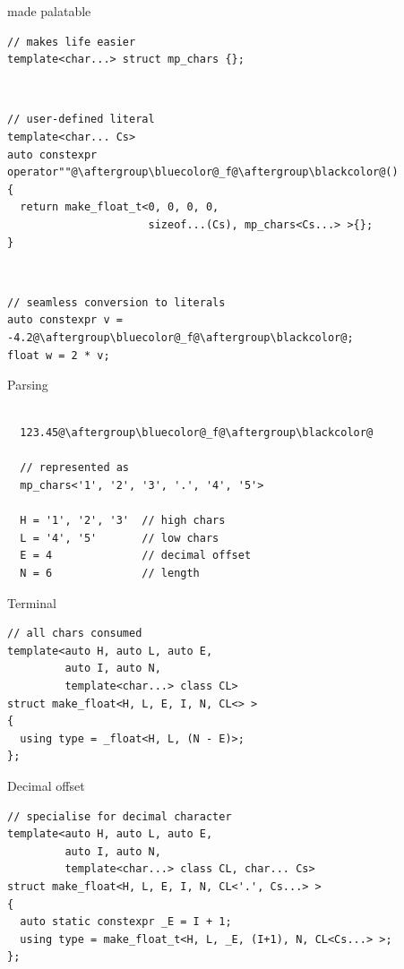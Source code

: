 \documentclass[xcolor=dvipsnames]{beamer}
\begin{document}
\begin{frame}[fragile]{made palatable}
\begin{lstlisting}
// makes life easier
template<char...> struct mp_chars {};
\end{lstlisting}

~

\begin{lstlisting}
// user-defined literal
template<char... Cs>
auto constexpr operator""@\aftergroup\bluecolor@_f@\aftergroup\blackcolor@()
{
  return make_float_t<0, 0, 0, 0,
                      sizeof...(Cs), mp_chars<Cs...> >{};
}
\end{lstlisting}

~

\begin{lstlisting}
// seamless conversion to literals
auto constexpr v = -4.2@\aftergroup\bluecolor@_f@\aftergroup\blackcolor@;
float w = 2 * v;
\end{lstlisting}
\end{frame}


\begin{frame}[fragile]{Parsing}
\begin{lstlisting}

  123.45@\aftergroup\bluecolor@_f@\aftergroup\blackcolor@

  // represented as
  mp_chars<'1', '2', '3', '.', '4', '5'>

  H = '1', '2', '3'  // high chars
  L = '4', '5'       // low chars
  E = 4              // decimal offset
  N = 6              // length

\end{lstlisting}
\end{frame}


\begin{frame}[fragile]{Terminal}
\begin{lstlisting}
// all chars consumed
template<auto H, auto L, auto E,
         auto I, auto N,
         template<char...> class CL>
struct make_float<H, L, E, I, N, CL<> >
{
  using type = _float<H, L, (N - E)>;
};
\end{lstlisting}
\end{frame}


\begin{frame}[fragile]{Decimal offset}
\begin{lstlisting}
// specialise for decimal character
template<auto H, auto L, auto E,
         auto I, auto N,
         template<char...> class CL, char... Cs>
struct make_float<H, L, E, I, N, CL<'.', Cs...> >
{
  auto static constexpr _E = I + 1;
  using type = make_float_t<H, L, _E, (I+1), N, CL<Cs...> >;
};
\end{lstlisting}
\end{frame}
\end{document}
